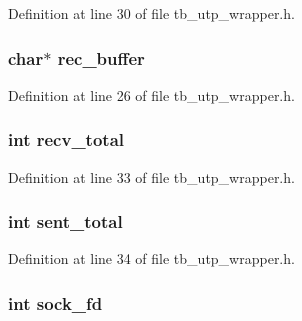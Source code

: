 Definition at line 30 of file tb\-\_\-utp\-\_\-wrapper.\-h.

\hypertarget{structtb__utp__wrapper__t_a2e6fac18f9532108c2aa44a52d3c6d67}{
\subsubsection[{rec\-\_\-buffer}]{\setlength{\rightskip}{0pt plus 5cm}char$\ast$ rec\-\_\-buffer}}\label{structtb__utp__wrapper__t_a2e6fac18f9532108c2aa44a52d3c6d67}


Definition at line 26 of file tb\-\_\-utp\-\_\-wrapper.\-h.

\hypertarget{structtb__utp__wrapper__t_abf192d5591e28d37f0795a6c730a9a5b}{
\subsubsection[{recv\-\_\-total}]{\setlength{\rightskip}{0pt plus 5cm}int recv\-\_\-total}}\label{structtb__utp__wrapper__t_abf192d5591e28d37f0795a6c730a9a5b}


Definition at line 33 of file tb\-\_\-utp\-\_\-wrapper.\-h.

\hypertarget{structtb__utp__wrapper__t_a8cb5bfce3dd82afd8155aae9c7328441}{
\subsubsection[{sent\-\_\-total}]{\setlength{\rightskip}{0pt plus 5cm}int sent\-\_\-total}}\label{structtb__utp__wrapper__t_a8cb5bfce3dd82afd8155aae9c7328441}


Definition at line 34 of file tb\-\_\-utp\-\_\-wrapper.\-h.

\hypertarget{structtb__utp__wrapper__t_a514331e6141a28289f8ddead55eadebd}{
\subsubsection[{sock\-\_\-fd}]{\setlength{\rightskip}{0pt plus 5cm}int sock\-\_\-fd}}\label{structtb__utp__wrapper__t_a514331e6141a28289f8ddead55eadebd}


